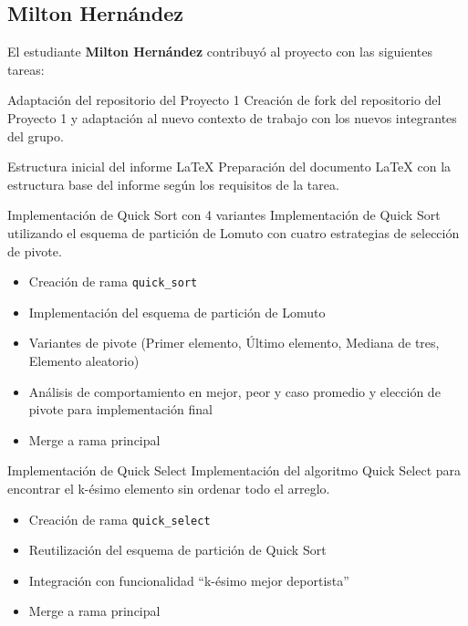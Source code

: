 \subsection*{Milton Hernández}
El estudiante \textbf{Milton Hernández} contribuyó al proyecto con las siguientes tareas:

\begin{taskdone}{Adaptación del repositorio del Proyecto 1}
    Creación de fork del repositorio del Proyecto 1 y adaptación al nuevo contexto de trabajo con los nuevos integrantes del grupo.

\end{taskdone}

\begin{taskdone}{Estructura inicial del informe LaTeX}
    Preparación del documento LaTeX con la estructura base del informe según los requisitos de la tarea.
\end{taskdone}

\begin{taskdone}{Implementación de Quick Sort con 4 variantes}
    Implementación de Quick Sort utilizando el esquema de partición de Lomuto con cuatro estrategias de selección de pivote.
    \begin{itemize}
        \item Creación de rama \texttt{quick\_sort}
        \item Implementación del esquema de partición de Lomuto
        \item Variantes de pivote (Primer elemento, Último elemento, Mediana de tres, Elemento aleatorio)
        \item Análisis de comportamiento en mejor, peor y caso promedio y elección de pivote para implementación final
        \item Merge a rama principal
    \end{itemize}
\end{taskdone}

\begin{taskdone}{Implementación de Quick Select}
    Implementación del algoritmo Quick Select para encontrar el k-ésimo elemento sin ordenar todo el arreglo.
    \begin{itemize}
        \item Creación de rama \texttt{quick\_select}
        \item Reutilización del esquema de partición de Quick Sort
        \item Integración con funcionalidad ``k-ésimo mejor deportista''
        \item Merge a rama principal
    \end{itemize}
\end{taskdone}

